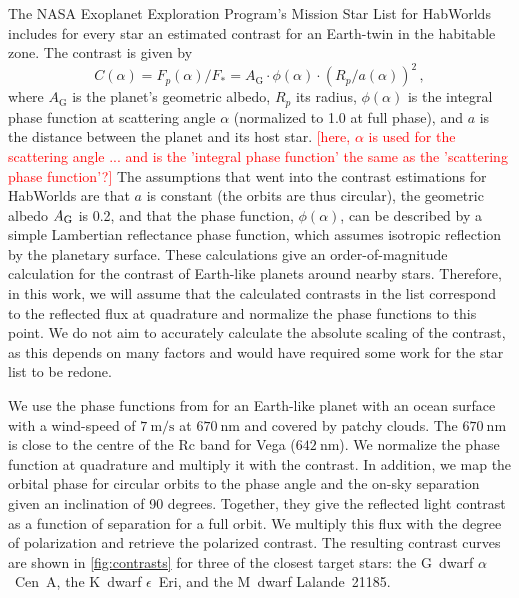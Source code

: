 \documentclass[
    usenatbib,
]{mnras}
\newcommand{\todo}[1]{\textcolor{red}{[#1]}}
\newcommand{\hwo}{HabWorlds}
\begin{document}
The NASA Exoplanet Exploration Program’s Mission Star List for \hwo{} 
includes for every star an estimated contrast for an Earth-twin in 
the habitable zone.
%
The contrast is given by \citep[see, e.g.,][]{2023A&A...671A.165M}
\begin{equation}
    C(\alpha) 
    = F_p(\alpha) / F_* 
    = A_\mathrm{G} \cdot \phi(\alpha) \cdot \left( R_p / a(\alpha) \right)^2 \,,
\label{eq:contrast}
\end{equation}
where $A_\mathrm{G}$ is the planet's geometric albedo, $R_p$ its radius, $\phi(\alpha)$ is the integral phase function at scattering angle $\alpha$
(normalized to \num{1.0} at full phase), and $a$ is the distance between the planet and its host star.
\todo{here, $\alpha$ is used for the scattering angle ... and is the 
'integral phase function' the same as the 'scattering phase function'?}
%
The assumptions that went into the contrast estimations for \hwo{}
are that $a$ is constant (the orbits are thus circular), the geometric albedo $A_{\rm G}$ is \num{0.2}, and that the phase function, $\phi(\alpha)$, can be described by a simple Lambertian reflectance phase function, which assumes isotropic reflection by the planetary surface.
%
These calculations give an order-of-magnitude calculation for the 
contrast of Earth-like planets around nearby stars.
%
Therefore, in this work, we will assume that the calculated contrasts 
in the list correspond to the reflected flux at quadrature and normalize the phase functions to this point.
%
We do not aim to accurately calculate the absolute scaling of the contrast, as this depends on many factors and would have required some work for the star list to be redone.
%

We use the phase functions from \citet{treesandstam2019} 
for an Earth-like planet with an ocean surface with a wind-speed of $\qty{7}{\meter\per\second}$ at $\qty{670}{\nano\meter}$ and covered by patchy clouds.
%
The $\qty{670}{\nano\meter}$ is close to the centre of the Rc band for Vega ($\qty{642}{\nano\meter}$). 
%
We normalize the phase function at quadrature and multiply it with the 
contrast.
%
In addition, we map the orbital phase for circular orbits to the phase angle and the on-sky separation given an inclination of \num{90} degrees.
%
Together, they give the reflected light contrast as a function of separation for a full orbit.
%
We multiply this flux with the degree of polarization and retrieve the polarized contrast.
%
The resulting contrast curves are shown in \cref{fig:contrasts} for 
three of the closest target stars: the G~dwarf $\alpha$~Cen~A, the K~dwarf 
$\epsilon$~Eri, and the M~dwarf Lalande~21185.
\end{document}
